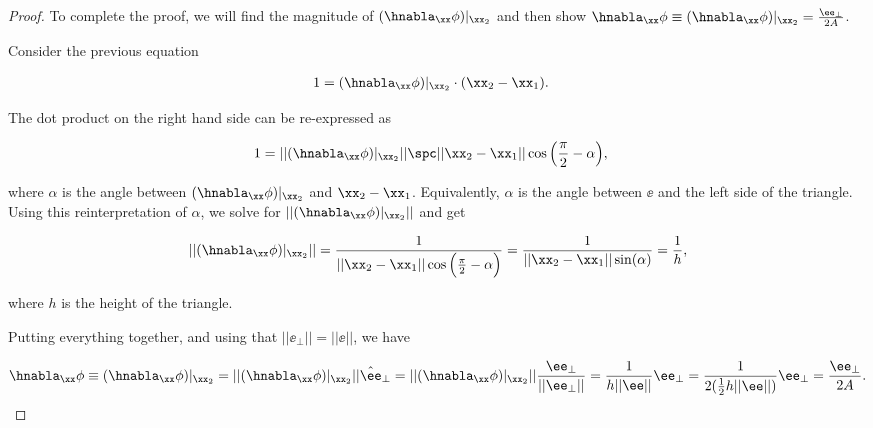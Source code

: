 \begin{proof}
    To complete the proof, we will find the magnitude of $(\hnabla_\xx \phi)|_{\xx_2}$ and then show $\hnabla_\xx \phi \equiv (\hnabla_\xx \phi)|_{\xx_2} = \frac{\ee_\perp}{2A}$.
    
    Consider the previous equation
    
    \begin{align*}
        1 &= (\hnabla_\xx \phi)|_{\xx_2} \cdot (\xx_2 - \xx_1).
    \end{align*}
    
    The dot product on the right hand side can be re-expressed as
    
    \begin{align*}
        1 &= ||(\hnabla_\xx \phi)|_{\xx_2}|| \spc ||\xx_2 - \xx_1|| \cos \Big( \frac{\pi}{2} - \alpha \Big),
    \end{align*}
    
    where $\alpha$ is the angle between $(\hnabla_\xx \phi)|_{\xx_2}$ and $\xx_2 - \xx_1$. Equivalently, $\alpha$ is the angle between $\ee$ and the left side of the triangle. Using this reinterpretation of $\alpha$, we solve for $||(\hnabla_\xx \phi)|_{\xx_2}||$ and get
    
    \begin{align*}
        ||(\hnabla_\xx \phi)|_{\xx_2}|| 
        = \frac{1}{||\xx_2 - \xx_1|| \cos\Big( \frac{\pi}{2} - \alpha \Big)}
        = \frac{1}{||\xx_2 - \xx_1|| \sin(\alpha)} = \frac{1}{h},
    \end{align*}
    
    where $h$ is the height of the triangle. 
    
    Putting everything together, and using that $||\ee_\perp|| = ||\ee||$, we have
    
    \begin{align*}
        \hnabla_\xx \phi \equiv (\hnabla_\xx \phi)|_{\xx_2} 
        = ||(\hnabla_\xx \phi)|_{\xx_2}|| \hat{\ee}_\perp 
        = ||(\hnabla_\xx \phi)|_{\xx_2}|| \frac{\ee_\perp}{||\ee_\perp||}
        = \frac{1}{h ||\ee||} \ee_\perp
        = \frac{1}{2(\frac{1}{2} h ||\ee||)} \ee_\perp
        = \frac{\ee_\perp}{2A}.
    \end{align*}
    
    
    

\end{proof}
